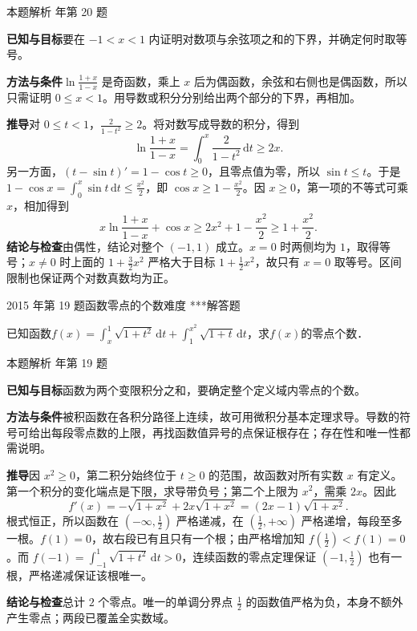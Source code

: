 \documentclass[UTF8,zihao=-4,fontset=fandol]{ctexart}
\newcounter{BankQuestion}
\newcommand{\QuestionPage}[7]{%
  \stepcounter{BankQuestion}%
  \par\noindent\begin{minipage}{\linewidth}
  \raggedright
  {\small\textcolor{black!60}{#3\quad #5\quad 难度 #7}\hfill\textcolor{accent}{#2}}\par\smallskip}
\newcommand{\QuestionEnd}{\end{minipage}\par\medskip}
\newcommand{\QuestionPage}[7]{%
  \clearpage
  \stepcounter{BankQuestion}%
  {\small\textcolor{accent}{#1\hfill #2}}\par\medskip
  {\small\textcolor{black!60}{#3\quad #5\quad 难度 #7\hfill \arabic{BankQuestion} / 234}}\par\vspace{9bp}}
\newcommand{\QuestionEnd}{}
\newenvironment{QuestionSolution}[1]{%
  \clearpage
  {\small\textcolor{black!60}{本题解析\quad #1}}\par\medskip
}{\par\clearpage}
\begin{document}
\begin{QuestionSolution}{2012 年第 20 题}
\textbf{已知与目标}\quad 要在 \(-1<x<1\) 内证明对数项与余弦项之和的下界，并确定何时取等号。

\textbf{方法与条件}\quad \(\ln\frac{1+x}{1-x}\) 是奇函数，乘上 \(x\) 后为偶函数，余弦和右侧也是偶函数，所以只需证明 \(0\le x<1\)。用导数或积分分别给出两个部分的下界，再相加。

\textbf{推导}\quad 对 \(0\le t<1\)，\(\frac2{1-t^2}\ge2\)。将对数写成导数的积分，得到
\[
\ln\frac{1+x}{1-x}=\int_0^x\frac{2}{1-t^2}\,\mathrm{d}t\ge 2x .
\]
另一方面，\((t-\sin t)'=1-\cos t\ge0\)，且零点值为零，所以 \(\sin t\le t\)。于是 \(1-\cos x=\int_0^x\sin t\,\mathrm dt\le\frac{x^2}{2}\)，即 \(\cos x\ge1-\frac{x^2}{2}\)。因 \(x\ge0\)，第一项的不等式可乘 \(x\)，相加得到
\[
x\ln\frac{1+x}{1-x}+\cos x\ge 2x^2+1-\frac{x^2}{2}
\ge 1+\frac{x^2}{2}.
\]
\textbf{结论与检查}\quad 由偶性，结论对整个 \((-1,1)\) 成立。\(x=0\) 时两侧均为 \(1\)，取得等号；\(x\ne0\) 时上面的 \(1+\frac32x^2\) 严格大于目标 \(1+\frac12x^2\)，故只有 \(\boxed{x=0}\) 取等号。区间限制也保证两个对数真数均为正。
\end{QuestionSolution}

\QuestionPage{2.6 函数性态的研究}{解答题}{2015 年第 19 题}{3}{函数零点的个数}{122 / 234}{***}
已知函数$f(x) = \int_x^1 \sqrt{1 + t^2} \,\mathrm{d} t + \int_1^{x^2} \sqrt{1 + t} \,\mathrm{d} t$，求$f(x)$的零点个数．
\QuestionEnd

\begin{QuestionSolution}{2015 年第 19 题}
\textbf{已知与目标}\quad 函数为两个变限积分之和，要确定整个定义域内零点的个数。

\textbf{方法与条件}\quad 被积函数在各积分路径上连续，故可用微积分基本定理求导。导数的符号可给出每段零点数的上限，再找函数值异号的点保证根存在；存在性和唯一性都需说明。

\textbf{推导}\quad 因 \(x^2\ge0\)，第二积分始终位于 \(t\ge0\) 的范围，故函数对所有实数 \(x\) 有定义。第一个积分的变化端点是下限，求导带负号；第二个上限为 \(x^2\)，需乘 \(2x\)。因此
\[
f'(x)=-\sqrt{1+x^2}+2x\sqrt{1+x^2}=(2x-1)\sqrt{1+x^2}.
\]
根式恒正，所以函数在 \((-\infty,\frac12)\) 严格递减，在 \((\frac12,+\infty)\) 严格递增，每段至多一根。\(f(1)=0\)，故右段已有且只有一个根；由严格增加知 \(f(\frac12)<f(1)=0\)。而 \(f(-1)=\int_{-1}^1\sqrt{1+t^2}\,\mathrm dt>0\)，连续函数的零点定理保证 \((-1,\frac12)\) 也有一根，严格递减保证该根唯一。

\textbf{结论与检查}\quad 总计 \(\boxed{2}\) 个零点。唯一的单调分界点 \(\frac12\) 的函数值严格为负，本身不额外产生零点；两段已覆盖全实数域。
\end{QuestionSolution}
\end{document}
